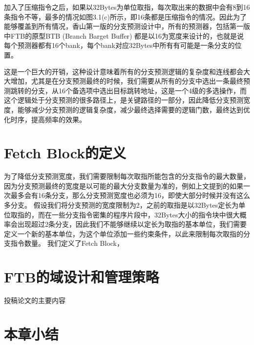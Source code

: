 加入了压缩指令之后，如果以32Bytes为单位取指，每次取出来的数据中会有8到16条指令不等，最多的情况如图3.1(c)所示，即16条都是压缩指令的情况。因此为了能够覆盖到所有情况，香山第一版的分支预测设计中，所有的预测器，包括第一版中FTB的原型BTB (Branch Barget Buffer) 都是以16为宽度来设计的，也就是说每个预测器都有16个bank，每个bank对应32Bytes中所有有可能是一条分支的位置。

这是一个巨大的开销，这种设计意味着所有的分支预测逻辑的复杂度和连线都会大大增加，尤其是在分支预测最终的时候，我们需要从所有的分支中选出一条最终预测跳转的分支，从16个备选项中选出目标跳转地址，这是一个4级的多选操作，而这个逻辑处于分支预测的很多路径上，是关键路径的一部分，因此降低分支预测宽度，能够减少分支预测的逻辑复杂度，减少最终选择需要的逻辑门数，最终达到优化时序，提高频率的效果。

\section{Fetch Block的定义}

为了降低分支预测宽度，我们需要限制每次取指所能包含的分支指令的最大数量，因为分支预测最终的宽度是以可能的最大分支数量为准的，例如上文提到的如果一次最多会有16条分支，那么分支预测宽度也必须为16，即使大部分时候并没有这么多分支。
假设我们将分支预测的宽度限制为2，之前的取指是以32Bytes定长为单位取指的，而在一些分支指令密集的程序片段中，32Bytes大小的指令块中很大概率会出现超过2条分支，因此我们不能够继续以定长为取指的基本单位，我们需要定义一个新的基本单位，为这个单位添加一些约束条件，以此来限制每次取指的分支指令数量。
我们定义了Fetch Block，

\section{FTB的域设计和管理策略}

投稿论文的主要内容


\section{本章小结}


